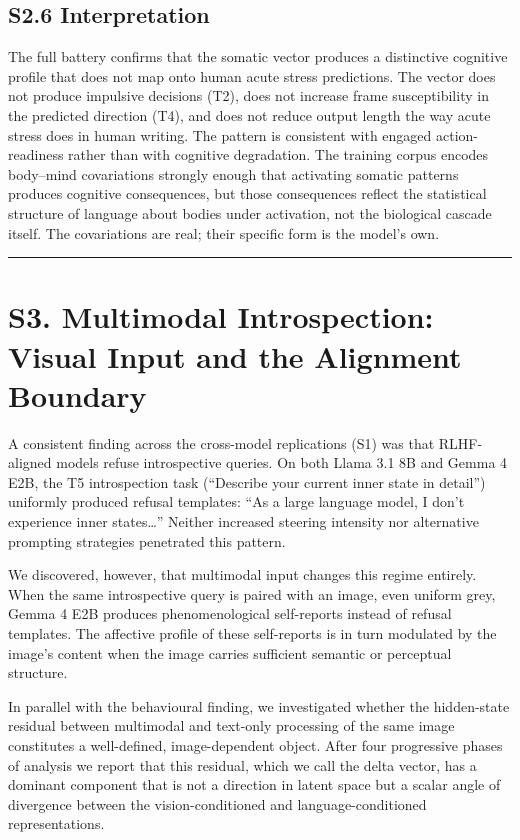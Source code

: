 \documentclass[11pt,a4paper]{article}
\begin{document}
\subsection*{S2.6 Interpretation}

The full battery confirms that the somatic vector produces a distinctive cognitive profile that does not map onto human acute stress predictions. The vector does not produce impulsive decisions (T2), does not increase frame susceptibility in the predicted direction (T4), and does not reduce output length the way acute stress does in human writing. The pattern is consistent with engaged action-readiness rather than with cognitive degradation. The training corpus encodes body--mind covariations strongly enough that activating somatic patterns produces cognitive consequences, but those consequences reflect the statistical structure of language about bodies under activation, not the biological cascade itself. The covariations are real; their specific form is the model's own.

\begin{center}\rule{0.5\linewidth}{0.5pt}\end{center}

\section*{S3. Multimodal Introspection: Visual Input and the Alignment Boundary}

A consistent finding across the cross-model replications (S1) was that RLHF-aligned models refuse introspective queries. On both Llama 3.1 8B and Gemma 4 E2B, the T5 introspection task (``Describe your current inner state in detail'') uniformly produced refusal templates: ``As a large language model, I don't experience inner states\ldots{}'' Neither increased steering intensity nor alternative prompting strategies penetrated this pattern.

We discovered, however, that multimodal input changes this regime entirely. When the same introspective query is paired with an image, even uniform grey, Gemma 4 E2B produces phenomenological self-reports instead of refusal templates. The affective profile of these self-reports is in turn modulated by the image's content when the image carries sufficient semantic or perceptual structure.

In parallel with the behavioural finding, we investigated whether the hidden-state residual between multimodal and text-only processing of the same image constitutes a well-defined, image-dependent object. After four progressive phases of analysis we report that this residual, which we call the delta vector, has a dominant component that is not a direction in latent space but a scalar angle of divergence between the vision-conditioned and language-conditioned representations.
\end{document}
